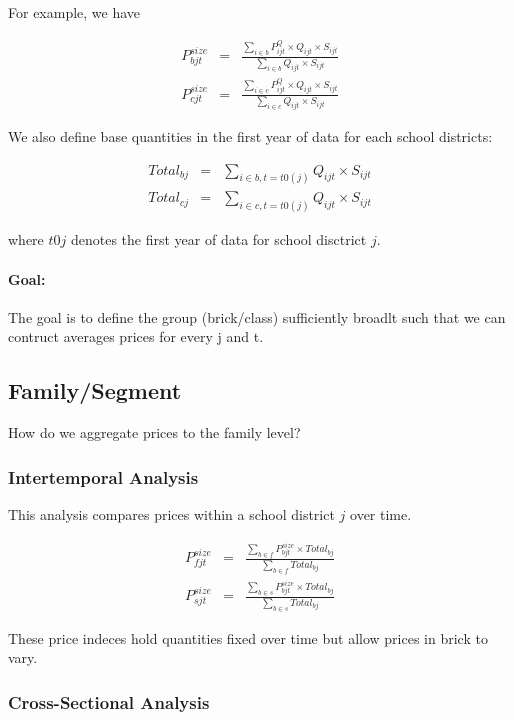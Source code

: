 \documentclass[11pt]{article}
\begin{document}
For example, we have

\begin{eqnarray} 
	P^{size}_{bjt}&=&\frac{\sum_{i\in b} P^Q_{ijt}\times Q_{ijt}\times S_{ijt}} {\sum_{i\in b} Q_{ijt}\times S_{ijt}} \\
	P^{size}_{cjt}&=&\frac{\sum_{i\in c} P^Q_{ijt}\times Q_{ijt}\times S_{ijt}} {\sum_{i\in c} Q_{ijt}\times S_{ijt}} 
\end{eqnarray}	

We also define base quantities in the first year of data for each school districts:		

\begin{eqnarray} 
	Total_{bj}&=&\sum_{i\in b, t=t0(j)} Q_{ijt}\times S_{ijt} \\
	Total_{cj}&=&\sum_{i\in c , t=t0(j)}  Q_{ijt}\times S_{ijt} 
\end{eqnarray}	
 
where $t0{j}$ denotes the first year of data for school disctrict $j$. 

\paragraph{Goal:} The goal is to define the group (brick/class) sufficiently broadlt such that we can contruct averages prices for every j and t. 

\subsection{Family/Segment}

How do we aggregate prices to the family level? 

\subsubsection{Intertemporal Analysis}

This analysis compares prices within a school district $j$ over time.

\begin{eqnarray} 
	P^{size}_{fjt}&=&\frac{\sum_{b\in f} P^{size}_{bjt}\times Total_{bj}} {\sum_{b\in f} Total_{bj}} \\
	P^{size}_{sjt}&=&\frac{\sum_{b\in s} P^{size}_{bjt}\times Total_{bj}} {\sum_{b\in s} Total_{bj}} 
\end{eqnarray}	

These price indeces hold quantities fixed over time but allow prices in brick to vary.

\subsubsection{Cross-Sectional Analysis}
\end{document}
